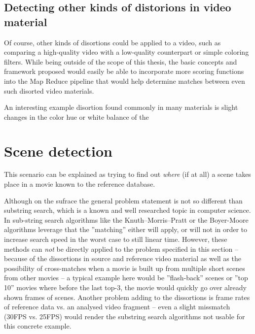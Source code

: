 \subsection{Detecting other kinds of distorions in video material}

Of course, other kinds of disortions could be applied to a video, such as comparing a high-quality video with a low-quality counterpart or simple coloring filters. While being outside of the scope of this thesis, the basic concepts and framework proposed would easily be able to incorporate more scoring functions into the Map Reduce pipeline that would help determine matches between even such disorted video materials. 

An interesting example disortion found commonly in many materials is slight changes in the color hue or white balance of the 


\section{Scene detection}
\label{sec:scene-detection}
This scenario can be explained as trying to find out \textit{where} (if at all) a scene takes place in a movie known to the reference database. 

Although on the sufrace the general problem statement is not so different than substring search, which is a known and well researched topic in computer science. In sub-string search algorithms like the Knuth–Morris–Pratt \cite{kmp-string-search} or the Boyer-Moore \cite{boyer-string-search} algorithms leverage that the ''matching'' either will apply, or will not in order to increase search speed in the worst case to still linear time. However, these methods can \textit{not} be directly applied to the problem specified in this section -- because of the dissortions in source and reference video material as well as the possibility of cross-matches when a movie is built up from multiple short scenes from other movies -- a typical example here would be ''flash-back'' scenes or ''top 10'' movies where before the last top-3, the movie would quickly go over already shown frames of scenes. Another problem adding to the dissortions is frame rates of reference data vs. an analysed video fragment -- even a slight missmatch (30FPS vs. 25FPS) would render the substring search algorithms not usable for this concrete example.

